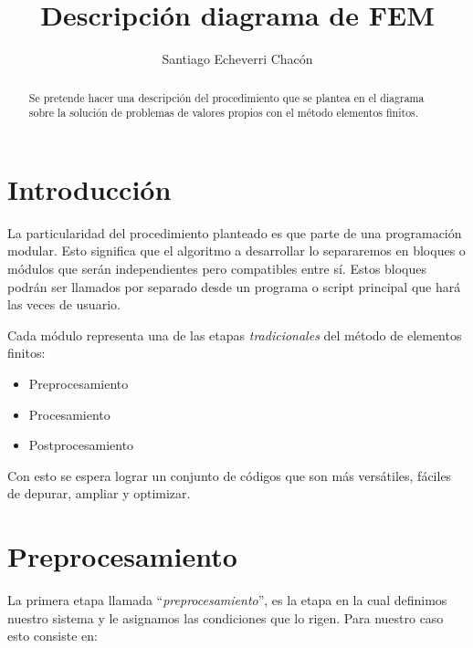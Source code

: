 \documentclass[12pt,letterpaper]{article}
\title{\textbf{Descripci\'on diagrama de FEM}}
\author{Santiago Echeverri Chac\'on}
\begin{document}
 
\maketitle


\begin{abstract}
Se pretende hacer una descripci\'on del procedimiento que se plantea en el diagrama sobre la soluci\'on de problemas 
de valores propios con  el m\'etodo elementos finitos. 
\end{abstract}

\section{Introducci\'on}

La particularidad del procedimiento planteado es que parte de una programaci\'on modular. Esto significa que el algoritmo a desarrollar lo separaremos en bloques o m\'odulos que ser\'an independientes pero compatibles entre s\'i. Estos bloques podr\'an ser llamados por  separado desde un programa o script principal que har\'a las veces de usuario. 

Cada m\'odulo representa una de las etapas \emph{tradicionales} del m\'etodo de elementos finitos:
\begin{itemize}
  \item Preprocesamiento
  \item Procesamiento
  \item Postprocesamiento
\end{itemize}

  Con esto se espera lograr un conjunto de c\'odigos que son m\'as vers\'atiles, f\'aciles de depurar, ampliar y optimizar. 
 
\section{Preprocesamiento}
 La primera etapa llamada ``\textit{preprocesamiento}'', es la etapa en la cual definimos nuestro sistema y le asignamos las condiciones que  lo rigen.
 Para nuestro caso esto consiste en:
\end{document}
